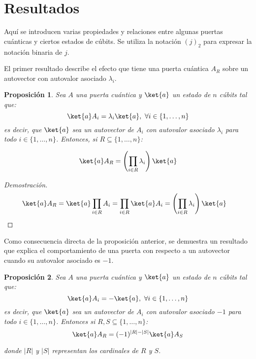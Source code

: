 \documentclass[10pt,conference,a4paper]{IEEEtran}
\newtheorem{prop}{Proposición}[section]
\providecommand{\abs}[1]{\lvert#1\rvert}
\begin{document}
\section{Resultados}
\label{seccion:5}
Aquí se introducen varias propiedades y relaciones entre algunas puertas cuánticas y ciertos estados de cúbits. Se utiliza  la notación $(j)_2$ para expresar la notación binaria de $j$.

El primer resultado   describe el efecto que tiene  una puerta cuántica $A_R$ sobre un autovector con autovalor asociado $\lambda_i$.
\vspace{1mm}
\begin{prop}
    Sea $A$ una puerta cuántica y $\ket{a}$ un estado de $n$ cúbits tal que:
    $$\ket{a}A_i=\lambda_i\ket{a},\ \forall i\in \{1,\ldots, n\}$$
    es decir, que $\ket{a}$ sea un autovector de $A_i$ con autovalor asociado $\lambda_i$ para todo $i\in \{1,\ldots, n\}$. Entonces, si 
    $R\subseteq\{1,\ldots, n\}$:
    
    \begin{equation}
        \ket{a}A_R=\displaystyle\left(\prod_{i\in R}\lambda_i\right)\ket{a}
    \end{equation}
    \label{prop:3.5}
\end{prop}
 \begin{proof}[Demostración] 
    \begin{align*}
         \ket{a}A_R&=\ket{a}\displaystyle\prod_{i\in R}A_i=\displaystyle\prod_{i\in R}\ket{a}A_i=\displaystyle\left(\prod_{i\in R}\lambda_i\right)\ket{a}
    \end{align*}
\end{proof}
\vspace{1mm}
Como consecuencia directa de la proposición anterior, se demuestra un resultado que explica el comportamiento de una puerta con respecto a un autovector cuando su autovalor asociado es $-1$.
\vspace{1mm}
\begin{prop}
    Sea $A$ una puerta cuántica y $\ket{a}$ un estado de $n$ cúbits tal que:
    $$\ket{a}A_i=-\ket{a},\ \forall i\in \{1,\ldots, n\}$$
    es decir, que $\ket{a}$ sea un autovector de $A_i$ con autovalor asociado $-1$ para todo $i\in \{1,\ldots, n\}$. Entonces si 
    $R,S\subseteq\{1,\ldots, n\}$:
    \begin{equation}
        \ket{a}A_R=(-1)^{\abs{R}-\abs{S}}\ket{a}A_S
    \end{equation}
    \label{prop:4}
    
\noindent donde $\abs{R}$ y $\abs{S}$ representan los cardinales de $R$ y $S$.
\end{prop}
\end{document}
